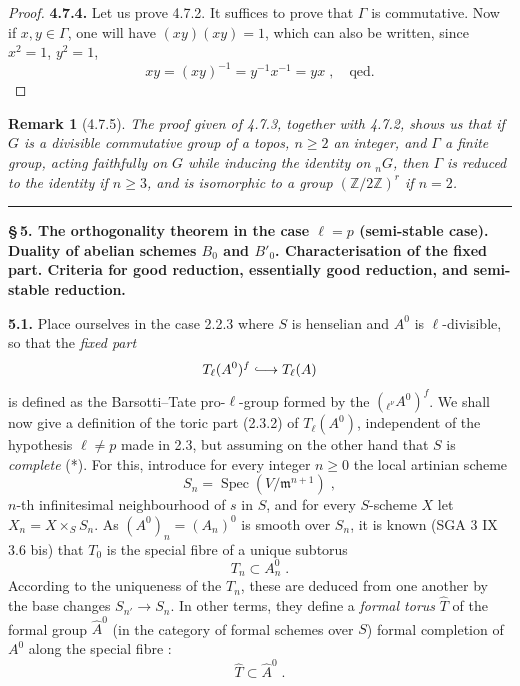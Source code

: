 \documentclass[11pt]{article}
\newtheorem{remarque}[proposition]{Remark}
\newcommand{\Spec}{\operatorname{Spec}}
\newcommand{\ZZ}{\mathbb Z}
\newcommand{\Tl}{T_{\ell}}
\newcommand{\frakm}{\mathfrak m}
\begin{document}
\begin{proof}
\medskip

\noindent\textbf{4.7.4.} Let us prove 4.7.2. It suffices to prove that
$\Gamma$ is commutative. Now if $x, y \in \Gamma$, one will have
$(xy)(xy) = 1$, which can also be written, since $x^2 = 1$, $y^2 = 1$,
\[
xy = (xy)^{-1} = y^{-1}x^{-1} = yx \; , \quad \text{qed.}
\]

\end{proof}

\begin{remarque}[4.7.5]
The proof given of 4.7.3, together with 4.7.2, shows us that if $G$ is
a divisible commutative group of a topos, $n \geq 2$ an integer, and
$\Gamma$ a finite group, acting faithfully on $G$ while inducing the
identity on ${}_n G$, then $\Gamma$ is reduced to the identity if $n
\geq 3$, and is isomorphic to a group $(\ZZ/2\ZZ)^r$ if $n = 2$.
\end{remarque}


\newpage
\hrule
\medskip

\noindent\textbf{\large \S\,5. The orthogonality theorem in the case
$\ell = p$ (semi-stable case). Duality of abelian schemes $B_0$ and
$B'_0$. Characterisation of the fixed part. Criteria for good
reduction, essentially good reduction, and semi-stable reduction.}

\smallskip

\noindent\textbf{5.1.} Place ourselves in the case 2.2.3 where $S$ is
henselian and $A^0$ is $\ell$-divisible, so that the \emph{fixed part}
\[
\Tl(A^0)^f \lhook\joinrel\longrightarrow \Tl(A)
\]
is defined as the Barsotti--Tate pro-$\ell$-group formed by the
$({}_{\ell^{\nu}}\!A^0)^f$. We shall now give a definition of the toric
part (2.3.2) of $\Tl(A^0)$, independent of the hypothesis $\ell \neq p$
made in 2.3, but assuming on the other hand that $S$ is \emph{complete}
(*). For this, introduce for every integer $n \geq 0$ the local artinian
scheme
\begin{equation}
S_n = \Spec(V/\frakm^{n+1}) \; ,
\end{equation}
$n$-th infinitesimal neighbourhood of $s$ in $S$, and for every
$S$-scheme $X$ let $X_n = X \times_S S_n$. As $(A^0)_n = (A_n)^0$ is
smooth over $S_n$, it is known (SGA 3 IX 3.6 bis) that $T_0$ is the
special fibre of a unique subtorus
\begin{equation}
T_n \subset A_n^0 \; .
\end{equation}
According to the uniqueness of the $T_n$, these are deduced from one
another by the base changes $S_{n'} \to S_n$. In other terms, they define
a \emph{formal torus} $\hat{T}$ of the formal group $\hat{A}^0$ (in the
category of formal schemes over $S$) formal completion of $A^0$ along
the special fibre :
\begin{equation}
\hat{T} \subset \hat{A}^0 \; .
\end{equation}
\end{document}
